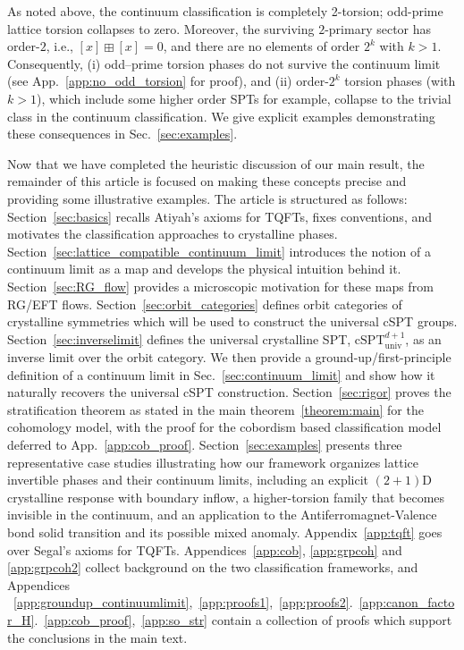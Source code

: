 \documentclass[aps,prx,reprint,superscriptaddress,twocolumn,amsmath,amssymb,amsfonts, nofootinbib]{revtex4-2}
\theoremstyle{apsstyle}
\begin{document}
\medskip


As noted above, the continuum classification is completely 2-torsion; odd-prime lattice torsion collapses to zero. Moreover, the surviving $2$-primary sector has order-$2$, i.e., $[x]\boxplus [x]=0$, and there are no elements of order $2^{k}$ with $k>1$. Consequently, (i) odd–prime torsion phases do not survive the continuum limit (see App.~\ref{app:no_odd_torsion} for proof), and (ii)  order-$2^{k}$ torsion phases (with $k>1$), which  include some higher order SPTs for example,  collapse to the trivial class in the continuum classification. We give explicit examples demonstrating these consequences in Sec.~\ref{sec:examples}.


Now that we have completed the heuristic discussion of our main result, the remainder of this article is focused on making these concepts precise and providing some illustrative examples. The article is structured as follows: Section~\ref{sec:basics} recalls Atiyah’s axioms for TQFTs, fixes conventions, and motivates the classification approaches to crystalline phases. Section~\ref{sec:lattice_compatible_continuum_limit} introduces the notion of a continuum limit as a map and develops the physical intuition behind it. Section~\ref{sec:RG_flow} provides a microscopic motivation for these maps from RG/EFT flows. Section~\ref{sec:orbit_categories} defines orbit categories of crystalline symmetries which will be used to construct the universal cSPT groups. Section~\ref{sec:inverselimit} defines the universal crystalline SPT, $\mathrm{cSPT}^{d+1}_{\mathrm{univ}}$, as an inverse limit over the orbit category. We then provide a ground-up/first-principle definition of a continuum limit in Sec.~\ref{sec:continuum_limit} and show how it naturally recovers the universal cSPT construction. Section~\ref{sec:rigor} proves the stratification theorem as stated in the main theorem~\ref{theorem:main} for the cohomology model, with the proof for the cobordism based classification model deferred to App.~\ref{app:cob_proof}. Section~\ref{sec:examples} presents three representative case studies illustrating how our framework organizes lattice invertible phases and their continuum limits, including an explicit $(2{+}1)$D crystalline response with boundary inflow, a higher-torsion family that becomes invisible in the continuum, and an application to the Antiferromagnet-Valence bond solid transition and its possible mixed anomaly. Appendix~\ref{app:tqft} goes over Segal's axioms for TQFTs. Appendices~\ref{app:cob}, \ref{app:grpcoh} and \ref{app:grpcoh2} collect background on the two classification frameworks, and Appendices ~\ref{app:groundup_continuumlimit},~\ref{app:proofs1},~\ref{app:proofs2}.~\ref{app:canon_factor_H}.~\ref{app:cob_proof},~\ref{app:so_str} contain a collection of proofs which support the conclusions in the main text.
\end{document}

